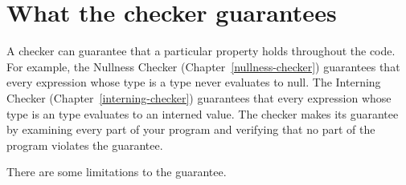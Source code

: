 \section{What the checker guarantees\label{checker-guarantees}}

A checker can guarantee that a particular property holds throughout the
code.  For example, the Nullness Checker (Chapter~\ref{nullness-checker})
guarantees that every expression whose type is a  type never
evaluates to null.  The Interning Checker (Chapter~\ref{interning-checker})
guarantees that every expression whose type is an  type
evaluates to an interned value.  The checker makes its guarantee by
examining every part of your program and verifying that no part of the
program violates the guarantee.

There are some limitations to the guarantee.


